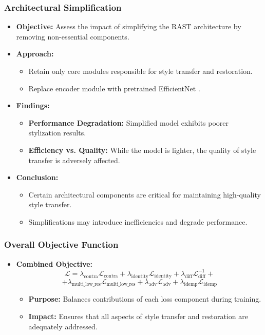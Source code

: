 \begin{frame}
\frametitle{Architectural Simplification}

\begin{itemize}
    \item \textbf{Objective:} Assess the impact of simplifying the RAST architecture by removing non-essential components.
    \item \textbf{Approach:}
    \begin{itemize}
        \item Retain only core modules responsible for style transfer and restoration.
        \item Replace encoder module with pretrained EfficientNet \cite{tan2020efficientnetrethinkingmodelscaling}.
    \end{itemize}
    \item \textbf{Findings:}
    \begin{itemize}
        \item \textbf{Performance Degradation:} Simplified model exhibits poorer stylization results.
        \item \textbf{Efficiency vs. Quality:} While the model is lighter, the quality of style transfer is adversely affected.
    \end{itemize}
    \item \textbf{Conclusion:}
    \begin{itemize}
        \item Certain architectural components are critical for maintaining high-quality style transfer.
        \item Simplifications may introduce inefficiencies and degrade performance.
    \end{itemize}
\end{itemize}

\end{frame}

\begin{frame}
\frametitle{Overall Objective Function}

\begin{itemize}
    \item \textbf{Combined Objective:}
    \[
    \mathcal{L} = \lambda_{\text{contra}} \mathcal{L}_{\text{contra}} + \lambda_{\text{identity}} \mathcal{L}_{\text{identity}} + \lambda_{\text{diff}} \mathcal{L}^{-1}_{\text{diff}} +
    \]
    \[
    + \lambda_{\text{multi\_low\_res}} \mathcal{L}_{\text{multi\_low\_res}} + \lambda_{\text{adv}} \mathcal{L}_{\text{adv}} + \lambda_{\text{idemp}} \mathcal{L}_{\text{idemp}}
    \]
    \begin{itemize}
        \item \textbf{Purpose:} Balances contributions of each loss component during training.
        \item \textbf{Impact:} Ensures that all aspects of style transfer and restoration are adequately addressed.
    \end{itemize}
\end{itemize}

\end{frame}
